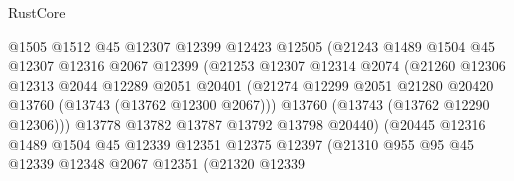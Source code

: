 \begin{lexlean}{RustCore}
\begin{coremodule}
                                @1505
                                @1512
                                @45
                                @12307
                                @12399
                                @12423
                                @12505
                                (@21243
                                  @1489
                                  @1504
                                  @45
                                  @12307
                                  @12316
                                  @2067
                                  @12399
                                  (@21253
                                    @12307
                                    @12314
                                    @2074
                                    (@21260
                                      @12306
                                      @12313
                                      @2044
                                      @12289
                                      @2051
                                      @20401
                                      (@21274
                                        @12299
                                        @2051
                                        @21280
                                        @20420
                                        @13760
                                        (@13743 (@13762 @12300 @2067)))
                                      @13760
                                      (@13743 (@13762 @12290 @12306)))
                                    @13778
                                    @13782
                                    @13787
                                    @13792
                                    @13798
                                    @20440)
                                  (@20445
                                    @12316
                                    @1489
                                    @1504
                                    @45
                                    @12339
                                    @12351
                                    @12375
                                    @12397
                                    (@21310
                                      @955
                                      @95
                                      @45
                                      @12339
                                      @12348
                                      @2067
                                      @12351
                                      (@21320
                                        @12339

\end{coremodule}
\end{lexlean}
